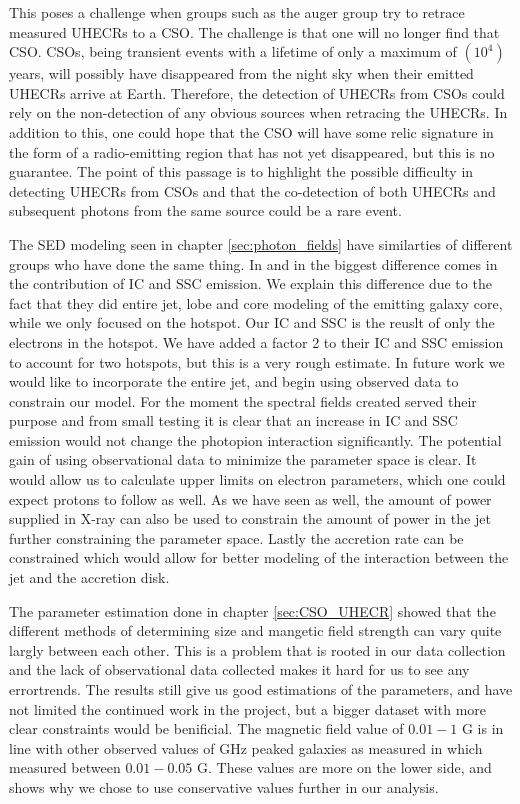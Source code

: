 This poses a challenge when groups such as the auger group try to retrace measured UHECRs to a CSO. The challenge is that one will no longer find that CSO. CSOs, being transient events with a lifetime of only a maximum of $(10^4)$ years, will possibly have disappeared from the night sky when their emitted UHECRs arrive at Earth. Therefore, the detection of UHECRs from CSOs could rely on the non-detection of any obvious sources when retracing the UHECRs. In addition to this, one could hope that the CSO will have some relic signature in the form of a radio-emitting region that has not yet disappeared, but this is no guarantee. The point of this passage is to highlight the possible difficulty in detecting UHECRs from CSOs and that the co-detection of both UHECRs and subsequent photons from the same source could be a rare event.

The SED modeling seen in chapter \ref{sec:photon_fields} have similarties of different groups who have done the same thing. In \cite{bronzini2024investigating} and in \cite{Ostorero_2010} the biggest difference comes in the contribution of IC and SSC emission. We explain this difference due to the fact that they did entire jet, lobe and core modeling of the emitting galaxy core, while we only focused on the hotspot. Our IC and SSC is the reuslt of only the electrons in the hotspot. We have added a factor 2 to their IC and SSC emission to account for two hotspots, but this is a very rough estimate. In future work we would like to incorporate the entire jet, and begin using observed data to constrain our model. For the moment the spectral fields created served their purpose and from small testing it is clear that an increase in IC and SSC emission would not change the photopion interaction significantly. The potential gain of using observational data to minimize the parameter space is clear. It would allow us to calculate upper limits on electron parameters, which one could expect protons to follow as well. As we have seen as well, the amount of power supplied in X-ray can also be used to constrain the amount of power in the jet further constraining the parameter space. Lastly the accretion rate can be constrained which would allow for better modeling of the interaction between the jet and the accretion disk.

The parameter estimation done in chapter \ref{sec:CSO_UHECR} showed that the different methods of determining size and mangetic field strength can vary quite largly between each other. This is a problem that is rooted in our data collection and the lack of observational data collected makes it hard for us to see any errortrends. The results still give us good estimations of the parameters, and have not limited the continued work in the project, but a bigger dataset with more clear constraints would be benificial. The magnetic field value of $0.01-1$ G is in line with other observed values of GHz peaked galaxies as measured in \cite{cheng2023highfrequency} which measured between $0.01 -0.05$ G. These values are more on the lower side, and shows why we chose to use conservative values further in our analysis.  

